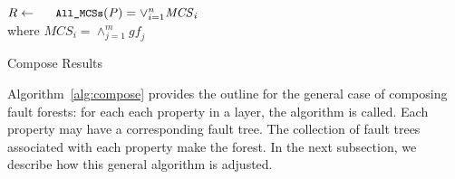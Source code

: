 \begin{algorithm}[h]

	$R \gets \mathit{\amcs(P)} = \lor_{i=1}^n \mathit{MCS}_i$\\
	where $\mathit{MCS}_i = \land_{j=1}^m \mathit{gf_j}$\\
	\caption{Compose Results}
	\label{alg:compose}
\end{algorithm}

Algorithm~\ref{alg:compose} provides the outline for the general case of composing fault forests: for each each property in a layer, the algorithm is called. Each property may have a corresponding fault tree. The collection of fault trees associated with each property make the forest. In the next subsection, we describe how this general algorithm is adjusted.

